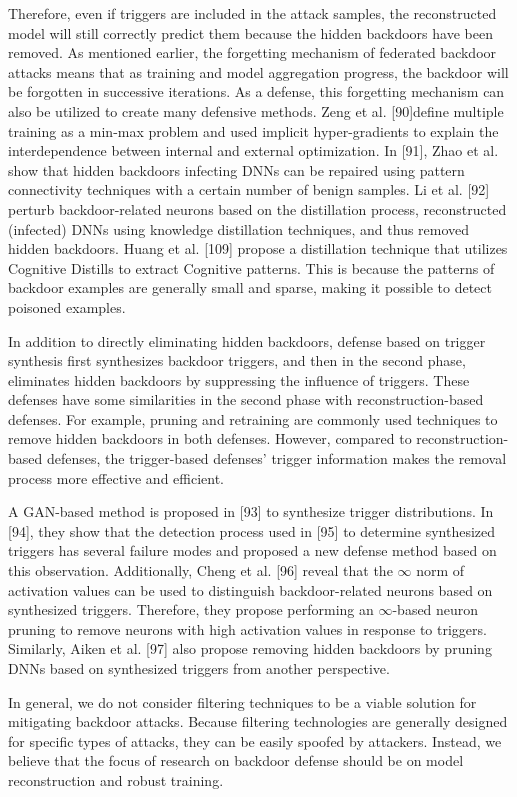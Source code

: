 Therefore, even if triggers are included in the attack
samples, the reconstructed model will still correctly predict
them because the hidden backdoors have been removed. As mentioned earlier, the forgetting mechanism of
federated backdoor attacks means that as training and
model aggregation progress, the backdoor will be forgotten
in successive iterations. As a defense, this forgetting
mechanism can also be utilized to create many defensive
methods. Zeng et al. [90]define multiple training as a min-max
problem and used implicit hyper-gradients to explain the
interdependence between internal and external optimization.
In [91], Zhao et al. show that hidden backdoors
infecting DNNs can be repaired using pattern connectivity
techniques with a certain number of benign samples. Li et al. [92] perturb backdoor-related neurons based
on the distillation process, reconstructed (infected) DNNs
using knowledge distillation techniques, and
thus removed hidden backdoors. Huang et al. [109] propose a
distillation technique that utilizes Cognitive Distills to
extract Cognitive patterns. This is because the patterns of
backdoor examples are generally small and sparse, making
it possible to detect poisoned examples.  

In addition to directly eliminating hidden backdoors,
defense based on trigger synthesis first synthesizes
backdoor triggers, and then in the second phase, eliminates
hidden backdoors by suppressing the influence of triggers.
These defenses have some similarities in the second phase
with reconstruction-based defenses. For example, pruning
and retraining are commonly used techniques to remove
hidden backdoors in both defenses. However, compared to
reconstruction-based defenses, the trigger-based defenses'
trigger information makes the removal process more effective and eﬀicient.  

A GAN-based method is proposed in [93] to synthesize
trigger distributions. In [94], they show that the detection
process used in [95] to determine synthesized triggers has
several failure modes and proposed a new defense method
based on this observation. Additionally, Cheng et al. [96]
reveal that the $\infty$ norm of activation values can be used to
distinguish backdoor-related neurons based on synthesized
triggers. Therefore, they propose performing an $\infty$-based
neuron pruning to remove neurons with high activation
values in response to triggers. Similarly, Aiken et al. [97]
also propose removing hidden backdoors by pruning DNNs
based on synthesized triggers from another perspective. 

In general, we do not consider filtering techniques to be
a viable solution for mitigating backdoor attacks. Because
filtering technologies are generally designed for specific
types of attacks, they can be easily spoofed by attackers.
Instead, we believe that the focus of research on backdoor
defense should be on model reconstruction and robust
training.